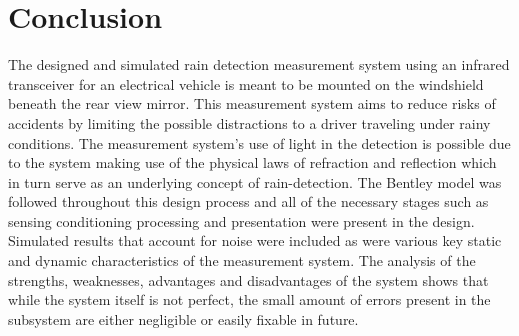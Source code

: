 \documentclass[conference, 11pt]{IEEEtran}
\begin{document}
\section{Conclusion}
The designed and simulated rain detection measurement system using an infrared transceiver for an electrical vehicle is meant to be mounted on the windshield beneath the rear view mirror. This measurement system aims to reduce risks of accidents by limiting the possible distractions to a driver traveling under rainy conditions. The measurement system's use of light in the detection is possible due to the system making use of the physical laws of refraction and reflection which in turn serve as an underlying concept of rain-detection. The Bentley model was followed throughout this design process and all of the necessary stages such as sensing conditioning processing and presentation were present in the design. Simulated results that account for noise were included as were various key static and dynamic characteristics of the measurement system. The analysis of the strengths, weaknesses, advantages and disadvantages of the system shows that while the system itself is not perfect, the small amount of errors present in the subsystem are either negligible or easily fixable in future.
\end{document}

